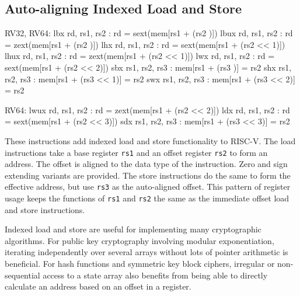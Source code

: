 

\newpage
\subsection{Auto-aligning Indexed Load and Store}
\label{sec:ildst}


\begin{cryptoisa}
RV32, RV64:
    lbx     rd,  rs1, rs2 : rd = sext(mem[rs1 + (rs2     )])
    lbux    rd,  rs1, rs2 : rd = zext(mem[rs1 + (rs2     )])
    lhx     rd,  rs1, rs2 : rd = sext(mem[rs1 + (rs2 << 1)])
    lhux    rd,  rs1, rs2 : rd = zext(mem[rs1 + (rs2 << 1)])
    lwx     rd,  rs1, rs2 : rd = sext(mem[rs1 + (rs2 << 2)])
    sbx     rs1, rs2, rs3 : mem[rs1 + (rs3     )] = rs2
    shx     rs1, rs2, rs3 : mem[rs1 + (rs3 << 1)] = rs2
    swx     rs1, rs2, rs3 : mem[rs1 + (rs3 << 2)] = rs2

RV64:
    lwux    rd,  rs1, rs2 : rd = zext(mem[rs1 + (rs2 << 2)])
    ldx     rd,  rs1, rs2 : rd = sext(mem[rs1 + (rs2 << 3)])
    sdx     rs1, rs2, rs3 : mem[rs1 + (rs3 << 3)] = rs2
\end{cryptoisa}


These instructions add indexed load and store functionality to RISC-V.
The load instructions take a base register {\tt rs1} and an offset
register {\tt rs2} to form an address.
The offset is aligned to the data type of the instruction.
Zero and sign extending variants are provided.
The store instructions do the same to form the effective address, but
use {\tt rs3} as the auto-aligned offset.
This pattern of register usage keeps the functions of {\tt rs1} and
{\tt rs2} the same as the immediate offset load and store instructions.

Indexed load and store are useful for implementing many cryptographic
algorithms.
For public key cryptography involving modular exponentiation, iterating
independently over several arrays without lots of pointer arithmetic
is beneficial.
For hash functions and symmetric key block ciphers, irregular or
non-sequential access to a state array also benefits from
being able to directly calculate an address based on an offset in a
register.
